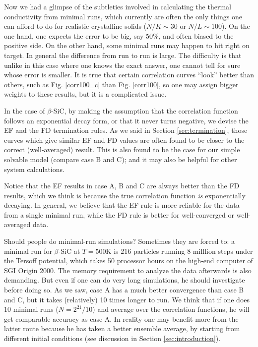 Now we had a glimpse of the subtleties involved in calculating the
thermal conductivity from minimal runs, which currently are often the
only things one can afford to do for realistic crystalline solids
($N/K \sim 30$ or $N/L \sim 100$). On the one hand, one expects the
error to be big, say $50\%$, and often biased to the positive side.
On the other hand, some minimal runs may happen to hit right on
target.  In general the difference from run to run is large.  The
difficulty is that unlike in this case where one knows the exact
answer, one cannot tell for sure whose error is smaller.  It is true
that certain correlation curves ``look'' better than others, such as
Fig.  \ref{corr100_c} than Fig.  \ref{corr100}, so one may assign
bigger weights to these results, but it is a complicated issue.

In the case of $\beta$-SiC, by making the assumption that the
correlation function follows an exponential decay form, or that it
never turns negative, we devise the EF and the FD termination rules.
As we said in Section \ref{sec:termination}, those curves which give
similar EF and FD values are often found to be closer to the correct
(well-averaged) result. This is also found to be the case for our
simple solvable model (compare case B and C); and it may also be
helpful for other system calculations.

Notice that the EF results in case A, B and C are always better than
the FD results, which we think is because the true correlation
function {\em is} exponentially decaying. In general, we believe that
the EF rule is more reliable for the data from a single minimal run,
while the FD rule is better for well-converged or well-averaged data.

Should people do minimal-run simulations? Sometimes they are forced
to: a minimal run for $\beta$-SiC at $T=500$K is 216 particles running
8 milllion steps under the Tersoff potential, which takes 50 processor
hours on the high-end computer of SGI Origin 2000.  The memory
requirement to analyze the data afterwards is also demanding.  But
even if one can do very long simulations, he should investigate before
doing so. As we saw, case A has a much better convergence than case B
and C, but it takes (relatively) 10 times longer to run.  We think
that if one does 10 minimal runs ($N=2^{21}/10$) and average over the
correlation functions, he will get comparable accuracy as case A. In
reality one may benefit more from the latter route because he has
taken a better ensemble average, by starting from different initial
conditions (see discussion in Section \ref{sec:introduction}).

